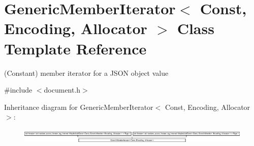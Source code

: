 \hypertarget{class_generic_member_iterator}{}\section{Generic\+Member\+Iterator$<$ Const, Encoding, Allocator $>$ Class Template Reference}
\label{class_generic_member_iterator}


(Constant) member iterator for a J\+S\+ON object value  




{\ttfamily \#include $<$document.\+h$>$}

Inheritance diagram for Generic\+Member\+Iterator$<$ Const, Encoding, Allocator $>$\+:\begin{figure}[H]
\begin{center}
\leavevmode
\includegraphics[height=0.731071cm]{class_generic_member_iterator}
\end{center}
\end{figure}
